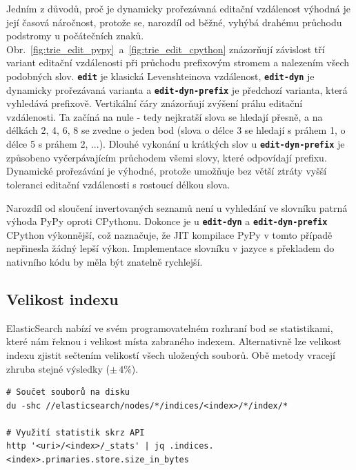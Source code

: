 \documentclass[11pt,letterpaper,oneside,openright]{book}
\newcommand{\bftt}[1]{\texttt{\textbf{#1}}}
\begin{document}
Jedním z důvodů, proč je dynamicky prořezávaná editační vzdálenost výhodná je
její časová náročnost, protože se, narozdíl od běžné, vyhýbá drahému průchodu
podstromy u počátečních znaků.
Obr.~\ref{fig:trie_edit_pypy}~a~\ref{fig:trie_edit_cpython} znázorňují
závislost tří variant editační vzdálenosti při průchodu prefixovým stromem a
nalezením všech podobných slov. \bftt{edit} je klasická Levenshteinova
vzdálenost, \bftt{edit-dyn} je dynamicky prořezávaná varianta a
\bftt{edit-dyn-prefix} je předchozí varianta, která vyhledává prefixově.
Vertikální čáry znázorňují zvýšení práhu editační vzdálenosti. Ta začíná na
nule - tedy nejkratší slova se hledají přesně, a na délkách 2, 4, 6, 8 se
zvedne o jeden bod (slova o délce 3 se hledají s práhem 1, o délce 5 s práhem
2, ...). Dlouhé vykonání u krátkých slov u \bftt{edit-dyn-prefix} je způsobeno
vyčerpávajícím průchodem všemi slovy, které odpovídají prefixu. Dynamické
prořezávání je výhodné, protože umožňuje bez větší ztráty vyšší toleranci
editační vzdálenosti s rostoucí délkou slova.

Narozdíl od sloučení invertovaných seznamů není u vyhledání ve slovníku patrná
výhoda PyPy oproti CPythonu. Dokonce je u \bftt{edit-dyn} a
\bftt{edit-dyn-prefix} CPython výkonnější, což naznačuje, že JIT kompilace PyPy
v tomto případě nepřinesla žádný lepší výkon. Implementace slovníku v jazyce s
překladem do nativního kódu by měla být znatelně rychlejší.



\newpage
\subsection{Velikost indexu}
ElasticSearch nabízí ve svém programovatelném rozhraní bod se statistikami,
které nám řeknou i velikost místa zabraného indexem. Alternativně lze velikost
indexu zjistit sečtením velikostí všech uložených souborů. Obě metody vracejí
zhruba stejné výsledky ($\pm\,4\%$).

\begin{Verbatim}
# Součet souborů na disku
du -shc //elasticsearch/nodes/*/indices/<index>/*/index/*

# Využití statistik skrz API
http '<uri>/<index>/_stats' | jq .indices.<index>.primaries.store.size_in_bytes
\end{Verbatim}
\end{document}
